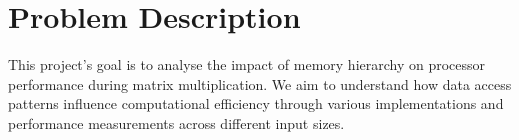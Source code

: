 \section{Problem Description}
This project's goal is to analyse the impact of memory hierarchy on 
processor performance during matrix multiplication. We aim to 
understand how data access patterns influence computational 
efficiency through various implementations and performance 
measurements across different input sizes.